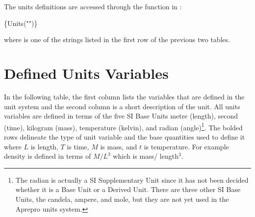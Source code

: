The units definitions are accessed through the  function in \aprepro{}:
\begin{apinp}
\{Units("")\}
\end{apinp}
where  is one of the strings listed in the first row
of the previous two tables. 

\section{Defined Units Variables}

In the following table, the first column lists the variables
that are defined in the \aprepro{} unit system and the second column
is a short description of the unit. All units variables are defined in
terms of the five SI Base Units metre (length), second (time),
kilogram (mass), temperature (kelvin), and radian (angle)\footnote{The
radian is actually a SI Supplementary Unit since it has not been
decided whether it is a Base Unit or a Derived Unit. There are three
other SI Base Units, the candela, ampere, and mole, but they are not
yet used in the Aprepro units system.}. The bolded rows
delineate the type of unit variable and the base quantities used to
define it where $L$ is length, $T$ is time, $M$ is mass, and $t$ is
temperature. For example density is defined in terms of $M/L^3$ which
is mass/ length$^3$.

